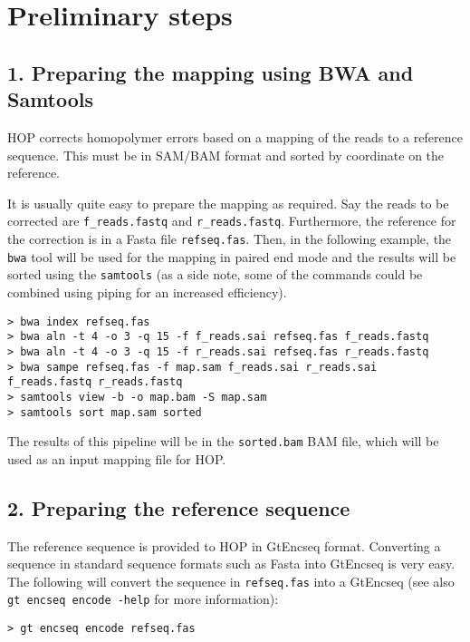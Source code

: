 \documentclass[12pt,titlepage]{article}
\newcommand{\Hop}{{HOP}\xspace}
\begin{document}
\section{Preliminary steps}

\subsection{1. Preparing the mapping using BWA and Samtools}

\Hop corrects homopolymer errors based on a mapping of the reads to a
reference sequence. This must be in SAM/BAM format and sorted by coordinate
on the reference.

It is usually quite easy to prepare the mapping as required.
Say the reads to be corrected are \texttt{f\_reads.fastq} and
\texttt{r\_reads.fastq}. Furthermore, the reference for the correction
is in a Fasta file \texttt{refseq.fas}. Then, in the following
example, the \texttt{bwa} tool will be used for the mapping in paired end mode
and the results will be sorted using the \texttt{samtools}
(as a side note, some of the commands could be combined using piping for an
increased efficiency).

\begin{footnotesize}
\begin{verbatim}
> bwa index refseq.fas
> bwa aln -t 4 -o 3 -q 15 -f f_reads.sai refseq.fas f_reads.fastq
> bwa aln -t 4 -o 3 -q 15 -f r_reads.sai refseq.fas r_reads.fastq
> bwa sampe refseq.fas -f map.sam f_reads.sai r_reads.sai f_reads.fastq r_reads.fastq
> samtools view -b -o map.bam -S map.sam
> samtools sort map.sam sorted
\end{verbatim}
\end{footnotesize}

The results of this pipeline will be in the \texttt{sorted.bam} BAM file,
which will be used as an input mapping file for \Hop.

\subsection{2. Preparing the reference sequence}

The reference sequence is provided to \Hop in GtEncseq format. Converting
a sequence in standard sequence formats such as Fasta into GtEncseq is very
easy. The following will convert the sequence in \texttt{refseq.fas}
into a GtEncseq (see also \texttt{gt encseq encode -help} for more information):

\begin{footnotesize}
\begin{verbatim}
> gt encseq encode refseq.fas
\end{verbatim}
\end{footnotesize}
\end{document}

